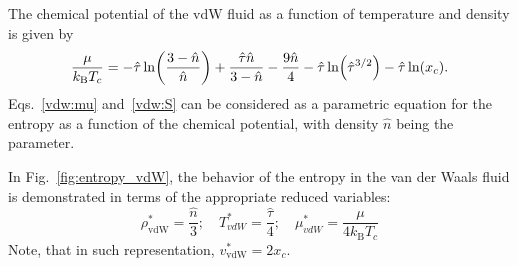 \documentclass[entropy,article,submit,pdftex,moreauthors]{Definitions/mdpi}
\begin{document}
The chemical potential of the vdW fluid as a function of temperature and density is given by~\cite[(70c)]{Johnston14}
\begin{equation}
	\label{vdw:mu}
	\frac{\mu}{k_{\rm B}T_c} = -\hat{\tau} \ln \left(\frac{3-\hat{n}}{\hat{n}}\right) + \frac{\hat{\tau}\hat{n}}{3-\hat{n}} - \frac{9\hat{n}}{4} - \hat{\tau}\ln(\hat{\tau}^{3/2}) - \hat{\tau}\ln(x_c).
\end{equation}
Eqs.~\eqref{vdw:mu} and~\eqref{vdw:S} can be considered as a parametric equation for the entropy as a function of the chemical potential, with density $\hat{n}$ being the parameter.

In Fig.~\ref{fig:entropy_vdW}, the behavior of the entropy in the van der Waals fluid is demonstrated in terms of the appropriate reduced variables:
\begin{equation}
	\rho^*_{\mathrm{vdW}} = \frac{\hat{n}}{3}; \quad T^*_{vdW} = \frac{\hat{\tau}}{4}; \quad \mu^*_{vdW} = \frac{\mu}{4k_{\mathrm B}T_c}
\end{equation}
Note, that in such representation, $v^*_{\mathrm{vdW}} = 2x_c$.
\end{document}
